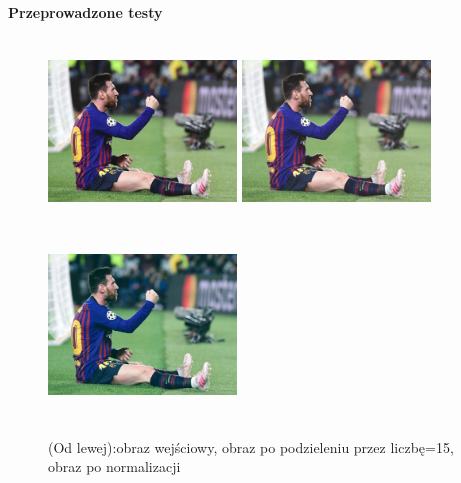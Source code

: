 \documentclass[magisterska,openany]{pracadypl}
\begin{document}
\vspace{0.25cm}\textbf{\Large Przeprowadzone testy}
\vspace{0.5cm}

\begin{figure}[h]
\centering
\includegraphics[width=5cm, height=5cm]{orgi/RGBMessi.jpg}
\includegraphics[width=5cm, height=5cm]{4_7/divconstRGB1.jpg}
\includegraphics[width=5cm, height=5cm]{4_7/ndivconstRGB1.jpg}
\caption{(Od lewej):obraz wejściowy,  obraz po podzieleniu przez liczbę=15,
obraz po normalizacji}
\end{figure}
\end{document}
